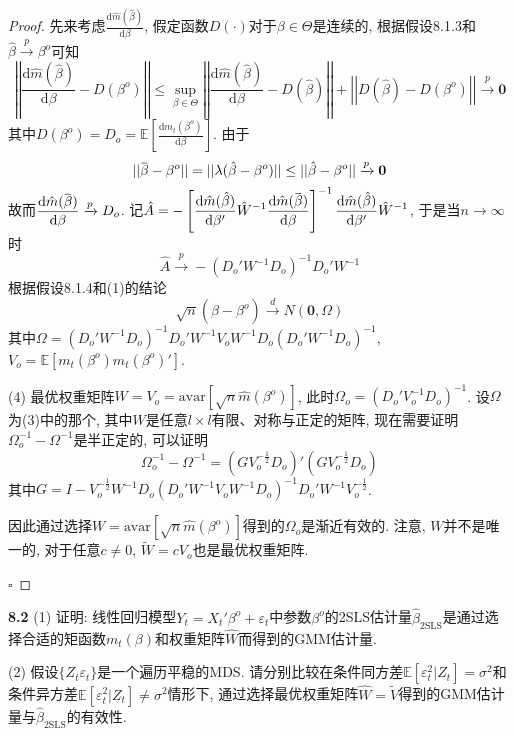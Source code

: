 \documentclass[cn,12pt,math=mtpro2,citestyle=gb7714-2015,bibstyle=gb7714-2015,twocol,mode=simple]{elegantbook}
\newcommand{\overbar}[1]{\mkern 1.5mu\overline{\mkern-1.5mu#1\mkern-1.5mu}\mkern 1.5mu}
\newcommand{\E}{\mathbb{E}}
\newcommand{\hbeta}{\hat{\beta}}
\newcommand{\btls}{\hat{\beta}_{\text{2SLS}}}
\newcommand{\hatm}{\hat{m}}
\newcommand{\dd}{\text{d}}
\begin{document}
\begin{proof}
  先来考虑$\displaystyle\frac{\dd\hatm(\hbeta)}{\dd\beta}$, 假定函数$D(\cdot)$对于$\beta\in\Theta$是连续的, 根据假设8.1.3和$\hat{\beta}\xrightarrow{p}\beta^o$可知
  $$\left|\left| \frac{\dd\hatm(\hbeta)}{\dd\beta}-D(\beta^o)\right|\right|\leq\sup_{\beta\in\Theta}\left|\left|\frac{\dd\hatm({\hbeta})}{\dd\beta}-D(\hat{\beta}) \right|\right|+\left|\left|D(\hbeta)-D(\beta^o) \right|\right|\xrightarrow{p}\mathbf{0}$$
  其中$\displaystyle D(\beta^o)=D_o=\E\left[\frac{\dd m_t(\beta^o)}{\dd\beta}\right]$. 由于
  $$||\overbar{\beta}-\beta^o||=||\lambda(\hbeta-\beta^o)||\leq||\hat{\beta}-\beta^o||\xrightarrow{p}\mathbf{0}$$
  故而$\displaystyle \frac{\dd\hatm(\overbar{\beta})}{\dd\beta}\xrightarrow{p}D_o$. 记$\hat{A}=\displaystyle -\left[\frac{\text{d}\hatm(\hbeta)}{\text{d}\beta'}\hat{W}^{-1}\frac{\text{d}\hatm(\overbar{\beta})}{\text{d}\beta}\right]^{-1}\frac{\text{d}\hat{m}(\hbeta)}{\text{d}\beta'}\hat{W}^{-1}$, 于是当$n\to\infty$时
  $$\hat{A}\xrightarrow{p}-(D_o'W^{-1}D_o)^{-1}D_o'W^{-1}$$
  根据假设8.1.4和(1)的结论
  $$\sqrt{n}(\hat{\beta}-\beta^o)\xrightarrow{d} N(\mathbf{0},\Omega)$$
  其中$\Omega=(D_o'W^{-1}D_o)^{-1}D_o'W^{-1}V_oW^{-1}D_o(D_o'W^{-1}D_o)^{-1}$, $V_o=\E[m_t(\beta^o)m_t(\beta^o)']$.

  (4) 最优权重矩阵$W=V_o=\text{avar}[\sqrt{n}\hatm(\beta^o)]$, 此时$\Omega_o=(D_o'V_o^{-1}D_o)^{-1}$. 设$\Omega$为(3)中的那个, 其中$W$是任意$l\times l$有限、对称与正定的矩阵, 现在需要证明$\Omega_o^{-1}-\Omega^{-1}$是半正定的, 可以证明
  $$\Omega_o^{-1}-\Omega^{-1}=\left(GV_o^{-\frac{1}{2}}D_o\right)'\left(GV_o^{-\frac{1}{2}}D_o\right)$$
  其中$G=I-V_o^{-\frac{1}{2}}W^{-1}D_o(D_o'W^{-1}V_oW^{-1}D_o)^{-1}D_o'W^{-1}V_o^{-\frac{1}{2}}$.

  因此通过选择$W=\text{avar}[\sqrt{n}\hatm(\beta^o)]$得到的$\Omega_o$是渐近有效的. 注意, $W$并不是唯一的, 对于任意$c\neq0$, $\tilde{W}=cV_o$也是最优权重矩阵.

  $\square$
  \end{proof}

  \textbf{8.2} (1) 证明: 线性回归模型$Y_t=X_t'\beta^o+\varepsilon_t$中参数$\beta^o$的2SLS估计量$\hat{\beta}_{\text{2SLS}}$是通过选择合适的矩函数$m_t(\beta)$和权重矩阵$\hat{W}$而得到的GMM估计量.

  (2) 假设$\{Z_t\varepsilon_t\}$是一个遍历平稳的MDS. 请分别比较在条件同方差$\E[\varepsilon_t^2|Z_t]=\sigma^2$和条件异方差$\E[\varepsilon_t^2|Z_t]\neq\sigma^2$情形下, 通过选择最优权重矩阵$\hat{W}=\tilde{V}$得到的GMM估计量与$\btls$的有效性.
\end{document}
